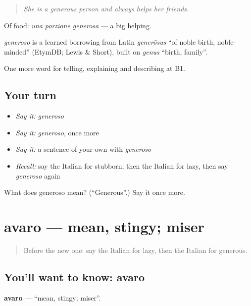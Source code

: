 \begin{quote}
\emph{She is a generous person and always helps her friends.}
\end{quote}

Of food: \emph{una porzione generosa} — a big helping.

\begin{cousinweb}
\emph{generoso} is a learned borrowing from Latin \emph{generōsus} \textquotedblleft{}of noble birth, noble-minded\textquotedblright{} (EtymDB; Lewis \& Short), built on \emph{genus} \textquotedblleft{}birth, family\textquotedblright{}.
\end{cousinweb}

\begin{grammarlens}[title={What you've built}]
One more word for telling, explaining and describing at B1.
\end{grammarlens}

\subsection*{Your turn}
\begin{itemize}
\raggedright
  \item \emph{Say it:} \emph{generoso}
  \item \emph{Say it:} \emph{generoso}, once more
  \item \emph{Say it:} a sentence of your own with \emph{generoso}
  \item \emph{Recall:} say the Italian for stubborn, then the Italian for lazy, then say \emph{generoso} again
\end{itemize}

\begin{tcolorbox}[breakable,colback=teal!4,colframe=teal!35!black,title={Before you move on}]
What does generoso mean? (\textquotedblleft{}Generous\textquotedblright{}.) Say it once more.
\end{tcolorbox}
\section[avaro]{avaro — mean, stingy; miser}

\label{lesson:IT-C472-avaro}



\begin{quote}
Before the new one: say the Italian for lazy, then the Italian for generous.
\end{quote}

\subsection*{You'll want to know: avaro}
\textbf{avaro} — \textquotedblleft{}mean, stingy; miser\textquotedblright{}.

